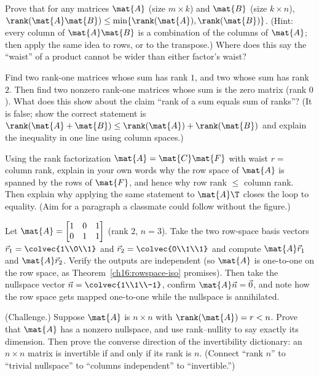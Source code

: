 \begin{exercise}\label{ch16:ex-rank-bound}
Prove that for any matrices $\mat{A}$ (size $m\times k$) and $\mat{B}$ (size
$k\times n$), $\rank(\mat{A}\mat{B}) \le \min\{\rank(\mat{A}),\rank(\mat{B})\}$.
(Hint: every column of $\mat{A}\mat{B}$ is a combination of the columns of
$\mat{A}$; then apply the same idea to rows, or to the transpose.) Where does this
say the ``waist'' of a product cannot be wider than either factor's waist?
\end{exercise}

\begin{exercise}\label{ch16:ex-rankone-sum-trap}
Find two rank-one matrices whose sum has rank $1$, and two whose sum has rank $2$.
Then find two nonzero rank-one matrices whose sum is the zero matrix (rank $0$).
What does this show about the claim ``rank of a sum equals sum of ranks''? (It is
false; show the correct statement is $\rank(\mat{A}+\mat{B})\le
\rank(\mat{A})+\rank(\mat{B})$ and explain the inequality in one line using column
spaces.)
\end{exercise}

\begin{exercise}\label{ch16:ex-rowcol-proof}
Using the rank factorization $\mat{A}=\mat{C}\mat{F}$ with waist $r=$ column rank,
explain in your own words why the row space of $\mat{A}$ is spanned by the rows of
$\mat{F}$, and hence why row rank $\le$ column rank. Then explain why applying the
same statement to $\mat{A}\T$ closes the loop to equality. (Aim for a paragraph a
classmate could follow without the figure.)
\end{exercise}

\begin{exercise}\label{ch16:ex-rowspace-iso}
Let $\mat{A}=\begin{bmatrix} 1 & 0 & 1 \\ 0 & 1 & 1 \end{bmatrix}$ (rank $2$,
$n=3$). Take the two row-space basis vectors $\vec{r}_1=\colvec{1\\0\\1}$ and
$\vec{r}_2=\colvec{0\\1\\1}$ and compute $\mat{A}\vec{r}_1$ and $\mat{A}\vec{r}_2$.
Verify the outputs are independent (so $\mat{A}$ is one-to-one on the row space,
as Theorem~\ref{ch16:rowspace-iso} promises). Then take the nullspace vector
$\vec{n}=\colvec{1\\1\\-1}$, confirm $\mat{A}\vec{n}=\vec0$, and note how the row
space gets mapped one-to-one while the nullspace is annihilated.
\end{exercise}

\begin{exercise}\label{ch16:ex-challenge}
(Challenge.) Suppose $\mat{A}$ is $n\times n$ with $\rank(\mat{A})=r<n$. Prove that
$\mat{A}$ has a nonzero nullspace, and use rank--nullity to say exactly its
dimension. Then prove the converse direction of the invertibility dictionary: an
$n\times n$ matrix is invertible if and only if its rank is $n$. (Connect ``rank
$n$'' to ``trivial nullspace'' to ``columns independent'' to ``invertible.'')
\end{exercise}
